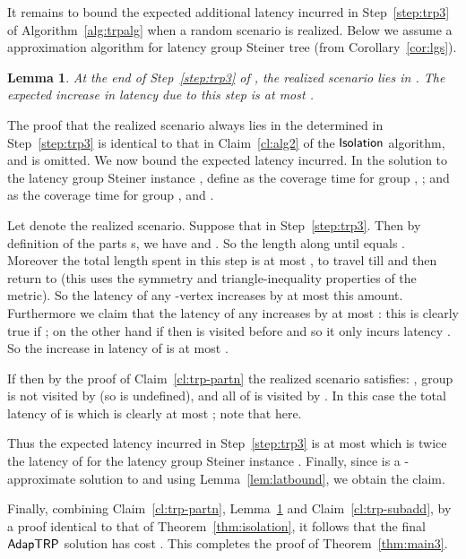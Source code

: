 \documentclass[11pt]{article}
\newtheorem{lemma}[thm]{Lemma}
\def\isoprob{\ensuremath{{\sf Isolation}}\xspace}
\def\strp{\ensuremath{{\sf AdapTRP}}\xspace}
\newenvironment{pf}{

\noindent{\bf Proof:}} {\hfill


}
\begin{document}
It remains to bound the expected additional latency incurred in Step~\ref{step:trp3} of Algorithm~\ref{alg:trpalg} when
a random scenario is realized. Below we assume a  approximation algorithm for latency group Steiner tree (from Corollary~\ref{cor:lgs}).


\begin{lemma}\label{lem:alg3}
  At the end of Step~\ref{step:trp3} of , the realized scenario lies in . 
    The expected increase in latency due to  this step is at most .
\end{lemma}
\begin{pf}
The proof that the realized scenario always lies in the  determined in Step~\ref{step:trp3} is identical to that
in Claim~\ref{cl:alg2} of the \isoprob algorithm, and is omitted. We now bound the expected latency incurred. In the solution  
to the latency group Steiner instance , define  as the coverage time for group , ; and  as the coverage time for group ,  and .

Let  denote the realized scenario. Suppose that  in Step~\ref{step:trp3}. Then by definition of the
parts s, we have  and . So the length along  until  equals . Moreover the total
length spent in this step is at most , to travel till  and then return to  (this uses the symmetry and triangle-inequality properties of the metric). So the latency
of any -vertex increases by at most this amount. Furthermore we claim that the latency of any  increases by
at most : this is clearly true if ; on the other hand if 
then  is visited before  and so it only incurs latency . So the increase in latency of  is
at most .

If  then by the proof of Claim~\ref{cl:trp-partn} the realized scenario  satisfies: , group  is not visited by  (so  is undefined), and all of  is visited by . In this case the total
latency of  is  which is clearly at most ; note that  here.

Thus the expected latency incurred in Step~\ref{step:trp3} is at most  which is twice the latency of  for the latency group
Steiner instance . Finally, since  is a -approximate solution to  and using
Lemma~\ref{lem:latbound}, we obtain the claim.
\end{pf}

Finally, combining Claim~\ref{cl:trp-partn}, Lemma~\ref{lem:alg3} and Claim~\ref{cl:trp-subadd}, 
by a proof identical to that of Theorem~\ref{thm:isolation}, it follows that the final \strp solution has cost . This completes the proof of 
Theorem~\ref{thm:main3}. 
\medskip
\end{document}
